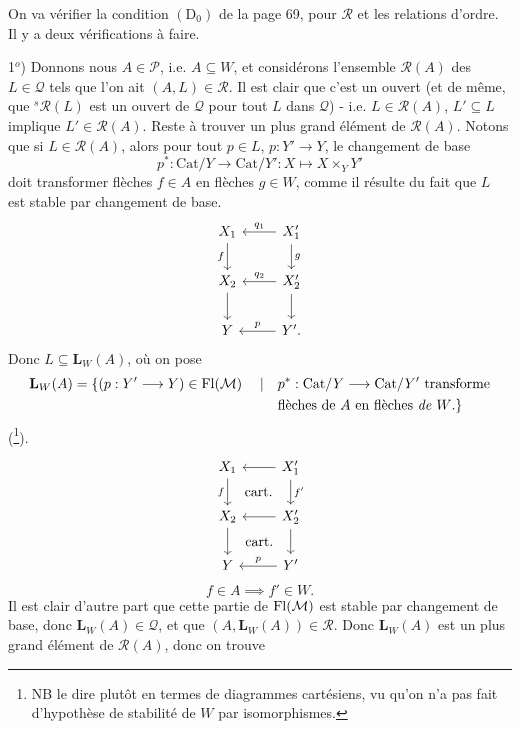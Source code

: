 On va vérifier la condition $(\mathrm{D}_0)$ de la page 69, pour $\mathcal{R}$ et les relations d'ordre. Il y a deux vérifications à faire.

1$^{o}$) Donnons nous $A\in\mathcal{P}$, i.e. $A\subseteq W$, et considérons l'ensemble $\mathcal{R}(A)$ des $L\in\mathcal{Q}$ tels que l'on ait $(A,L)\in\mathcal{R}$. Il est clair que c'est un ouvert (et de même, que ${}^{s}\mathcal{R}(L)$ est un ouvert de $\mathcal{Q}$ pour tout $L$ dans $\mathcal{Q}$) - i.e. $L\in\mathcal{R}(A)$, $L'\subseteq L$ implique %
$L'\in\mathcal{R}(A)$. Reste à trouver un plus grand élément de $\mathcal{R}(A)$. Notons que si $L\in\mathcal{R}(A)$, alors pour tout $p\in L$, $p : Y'\longrightarrow Y$, le changement de base
\[
p^{*} : \mathrm{Cat}/Y\longrightarrow\mathrm{Cat}/Y' : X\longmapsto X\times_{Y}Y'
\]
doit transformer flèches $f\in A$ en flèches $g\in W$, comme il résulte du fait que $L$ est stable par changement de base.
\[
\begin{tikzcd}
X_1 \arrow[d, "f"'] & X'_1 \arrow[l, "q_1"'] \arrow[d, "g"] \\
X_2 \arrow[d] & X'_2 \arrow[l, "q_2"'] \arrow[d] \\
Y & Y'. \arrow[l, "p"']
\end{tikzcd}
\]
Donc $L\subseteq\mathbf{L}_W(A)$, où on pose
\[
\begin{aligned}
\mathbf{L}_W(A)=\{(p : Y'\longrightarrow Y)\in\mathrm{Fl}(\mathcal{M})\quad\mid\quad & p^{*} : \mathrm{Cat}/Y\longrightarrow\mathrm{Cat}/Y'\ \text{transforme}\\
& \text{flèches de $A$ en flèches \textit{de} $W$.}\}
\end{aligned}
\]
(\footnote{NB le dire plutôt en termes de diagrammes cartésiens, vu qu'on n'a pas fait d'hypothèse de stabilité de $W$ par isomorphismes.}).
\[
\begin{tikzcd}
X_1 \arrow[d, "f"'] \arrow[dr, phantom, "\text{cart.}"] & X'_1 \arrow[l] \arrow[d, "f'"] \\
X_2 \arrow[d] \arrow[dr, phantom, "\text{cart.}"] & X'_2 \arrow[l] \arrow[d] \\
Y & Y' \arrow[l, "p"']
\end{tikzcd}
\]
\[
f\in A\implies f'\in W.
\]
Il est clair d'autre part que cette partie de $\mathrm{Fl}(\mathcal{M})$ est stable par changement de base, donc $\mathbf{L}_W(A)\in\mathcal{Q}$, et que $(A,\mathbf{L}_W(A))\in\mathcal{R}$. Donc $\mathbf{L}_W(A)$ est un plus grand élément de $\mathcal{R}(A)$, donc on trouve
